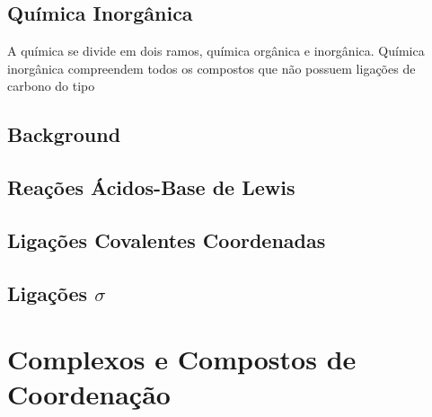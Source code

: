 \documentclass[12pt]{report}
\begin{document}

\section{Química Inorgânica}
A química se divide em dois ramos, química orgânica e inorgânica.
Química inorgânica compreendem todos os compostos que não possuem ligações de carbono do tipo 

\begin{appendices}
\setcounter{chapter}{1}
\chapter{Background}

\hypertarget{lewis}{}%
\section{Reações Ácidos-Base de Lewis}

\hypertarget{ligacoes covalentes coordenadas}{}%
\section{Ligações Covalentes Coordenadas}

\hypertarget{ligacao sigma}{}
\section{Ligações $\sigma$}

\end{appendices}

\chapter{Complexos e Compostos de Coordenação}
\end{document}
